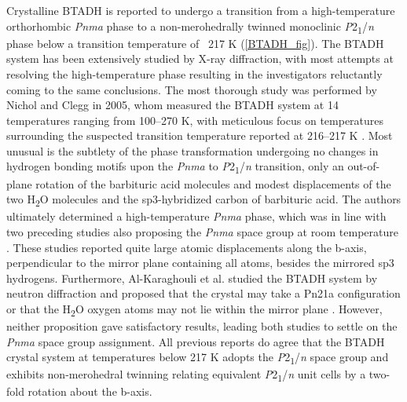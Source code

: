 Crystalline BTADH is reported to undergo a transition from a high-temperature orthorhombic \textit{Pnma} phase to a non-merohedrally twinned monoclinic \textit{P}2\textsubscript{1}/\textit{n} phase below a transition temperature of ~217 K (\autoref{BTADH_fig}). The BTADH system has been extensively studied by X-ray diffraction, with most attempts at resolving the high-temperature phase resulting in the investigators reluctantly coming to the same conclusions. The most thorough study was performed by Nichol and Clegg in 2005, whom measured the BTADH system at 14 temperatures ranging from 100–270 K, with meticulous focus on temperatures surrounding the suspected transition temperature reported at 216–217 K \citep{nichol_btadh_2005}. Most unusual is the subtlety of the phase transformation undergoing no changes in hydrogen bonding motifs upon the \textit{Pnma} to \textit{P}2\textsubscript{1}/\textit{n} transition, only an out-of-plane rotation of the barbituric acid molecules and modest displacements of the two H\textsubscript{2}O molecules and the sp3-hybridized carbon of barbituric acid. The authors ultimately determined a high-temperature \textit{Pnma} phase, which was in line with two preceding studies also proposing the \textit{Pnma} space group at room temperature \citep{1961_Jeffrey,1977_Al-Karaghouli}. These studies reported quite large atomic displacements along the b-axis, perpendicular to the mirror plane containing all atoms, besides the mirrored sp3 hydrogens. Furthermore, Al-Karaghouli et al. studied the BTADH system by neutron diffraction and proposed that the crystal may take a Pn21a configuration or that the H\textsubscript{2}O oxygen atoms may not lie within the mirror plane \citep{1977_Al-Karaghouli}. However, neither proposition gave satisfactory results, leading both studies to settle on the \textit{Pnma} space group assignment. All previous reports do agree that the BTADH crystal system at temperatures below 217 K adopts the \textit{P}2\textsubscript{1}/\textit{n} space group and exhibits non-merohedral twinning relating equivalent \textit{P}2\textsubscript{1}/\textit{n} unit cells by a two-fold rotation about the b-axis. 

